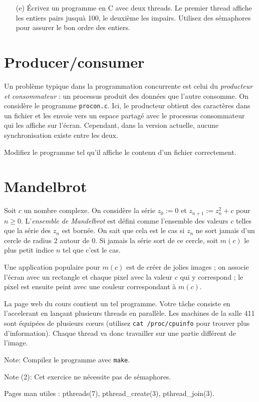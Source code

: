 \documentclass[11pt]{article}
\begin{document}
\begin{enumerate}
\item[(e)]
 \'Ecrivez un programme en C avec deux threads. Le premier thread
 affiche les entiers pairs jusqu\`a 100, le deuxi\`eme les impairs.
 Utilisez des s\'emaphores pour assurer le bon ordre des entiers.
\end{enumerate}

\section{Producer/consumer}

Un probl\`eme typique dans la programmation concurrente est celui du
\emph{producteur et consommateur} : un processus produit des donn\'ees
que l'autre consomme. On consid\`ere le programme 
\texttt{procon.c}. Ici, le producteur obtient des caract\`eres dans un
fichier et les envoie vers un espace partag\'e avec le processus consommateur
qui les affiche sur l'\'ecran. Cependant, dans la version actuelle,
aucune synchronisation existe entre les deux.

Modifiez le programme tel qu'il affiche le contenu d'un fichier correctement.

\section{Mandelbrot}

Soit $c$ un nombre complexe. On consid\`ere la s\'erie
$z_0:=0$ et $z_{n+1}:=z_n^2+c$ pour $n\ge0$. L'\emph{ensemble de Mandelbrot}
est d\'efini comme l'ensemble des valeurs $c$ telles que la s\'erie des $z_n$
est born\'ee. On sait que cela est le cas si $z_n$ ne sort jamais d'un
cercle de radius 2 autour de 0. Si jamais la s\'erie sort de ce cercle,
soit $m(c)$ le plus petit indice $n$ tel que c'est le cas.

Une application populaire pour $m(c)$ est de cr\'eer
de jolies images ; on associe l'\'ecran avec un rectangle et chaque pixel
avec la valeur $c$ qui y correspond ; le pixel est ensuite peint avec
une couleur correspondant \`a $m(c)$.

La page web du cours contient un tel programme. Votre t\^ache consiste
en l'accelerant en lan\c{c}ant plusieurs threads en parall\`ele.
Les machines de la salle 411 sont \'equip\'ees de plusieurs c\oe{}urs
(utilisez \texttt{cat /proc/cpuinfo} pour trouver plus d'information).
Chaque thread va donc travailler sur une partie diff\'erent de l'image.

Note: Compilez le programme avec \texttt{make}.

Note (2): Cet exercice ne n\'ecessite pas de s\'emaphores.

Pages man utiles : pthreads(7), pthread\_create(3), pthread\_join(3).
\end{document}
